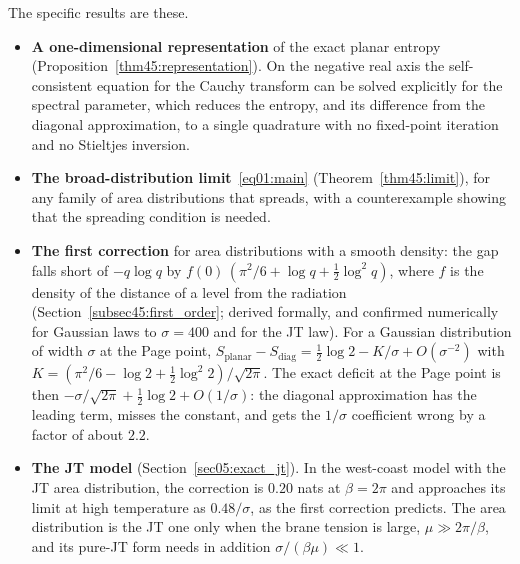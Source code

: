 \documentclass[11pt,letterpaper]{article}
\theoremstyle{plain}
\theoremstyle{definition}
\theoremstyle{remark}
\begin{document}
The specific results are these.
\begin{itemize}
\item \textbf{A one-dimensional representation} of the exact planar entropy (Proposition~\ref{thm45:representation}). On the negative real axis the self-consistent equation for the Cauchy transform can be solved explicitly for the spectral parameter, which reduces the entropy, and its difference from the diagonal approximation, to a single quadrature with no fixed-point iteration and no Stieltjes inversion.
\item \textbf{The broad-distribution limit}~\eqref{eq01:main} (Theorem~\ref{thm45:limit}), for any family of area distributions that spreads, with a counterexample showing that the spreading condition is needed.
\item \textbf{The first correction} for area distributions with a smooth density: the gap falls short of $-q\log q$ by $f(0)\,(\pi^2/6 + \log q + \tfrac12\log^2 q)$, where $f$ is the density of the distance of a level from the radiation (Section~\ref{subsec45:first_order}; derived formally, and confirmed numerically for Gaussian laws to $\sigma = 400$ and for the JT law). For a Gaussian distribution of width $\sigma$ at the Page point, $S_{\mathrm{planar}} - S_{\mathrm{diag}} = \tfrac12\log 2 - K/\sigma + O(\sigma^{-2})$ with $K = (\pi^2/6 - \log 2 + \tfrac12\log^2 2)/\sqrt{2\pi}$. The exact deficit at the Page point is then $-\sigma/\sqrt{2\pi} + \tfrac12\log 2 + O(1/\sigma)$: the diagonal approximation has the leading term, misses the constant, and gets the $1/\sigma$ coefficient wrong by a factor of about $2.2$.
\item \textbf{The JT model} (Section~\ref{sec05:exact_jt}). In the west-coast model with the JT area distribution, the correction is $0.20$ nats at $\beta = 2\pi$ and approaches its limit at high temperature as $0.48/\sigma$, as the first correction predicts. The area distribution is the JT one only when the brane tension is large, $\mu \gg 2\pi/\beta$, and its pure-JT form needs in addition $\sigma/(\beta\mu) \ll 1$.
\end{itemize}
\end{document}

